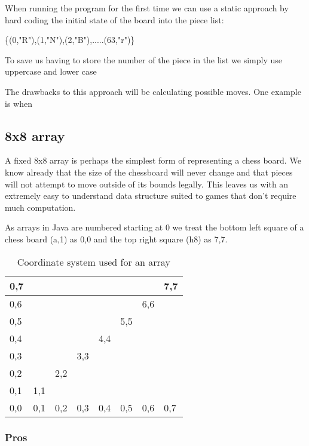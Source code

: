 \documentclass[11pt]{report}
\begin{document}
When running the program for the first time we can use a static approach by hard coding the initial state of the board into the piece list:

\begin{center}
{\Large \{(0,"R"),(1,"N"),(2,"B"),.....(63,"r")\}}
\end{center}

To save us having to store the number of the piece in the list we simply use uppercase and lower case

The drawbacks to this approach will be calculating possible moves. One example is when 

\subsection{8x8 array}

A fixed 8x8 array is perhaps the simplest form of representing a chess board. We know already that the size of the chessboard will never change and that pieces will not attempt to move outside of its bounds legally. This leaves us with an extremely easy to understand data structure suited to games that don't require much computation.

As arrays in Java are numbered starting at 0 we treat the bottom left square of a chess board (a,1) as 0,0 and the top right square (h8) as 7,7. \newline
\begin{table}[H]
\centering
\begin{tabular}{|l|l|l|l|l|l|l|l|}
\hline
0,7 &     &     &     &     &     &     & 7,7 \\ \hline
0,6 &     &     &     &     &     & 6,6 &     \\ \hline
0,5 &     &     &     &     & 5,5 &     &     \\ \hline
0,4 &     &     &     & 4,4 &     &     &     \\ \hline
0,3 &     &     & 3,3 &     &     &     &     \\ \hline
0,2 &     & 2,2 &     &     &     &     &     \\ \hline
0,1 & 1,1 &     &     &     &     &     &     \\ \hline
0,0 & 0,1 & 0,2 & 0,3 & 0,4 & 0,5 & 0,6 & 0,7 \\ \hline
\end{tabular}
\caption{Coordinate system used for an array}
\end{table}


\subsubsection{Pros}
\end{document}
